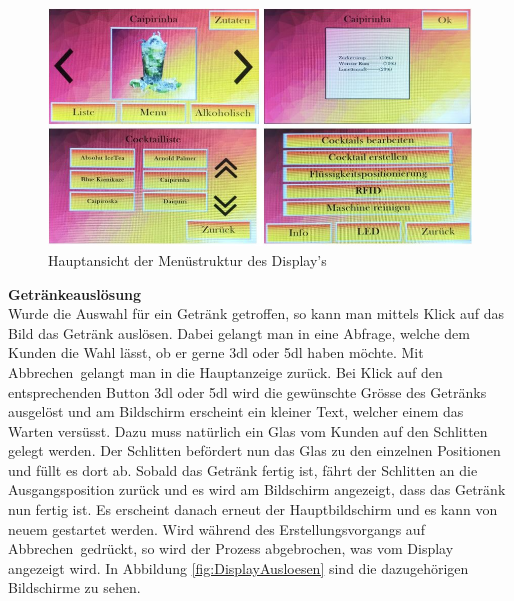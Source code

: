 \begin{figure}[H]
	\centering
	\includegraphics[width=\textwidth]{graphics/DisplayHauptmenu}
	\caption{Hauptansicht der Menüstruktur des Display's \cite{pngimgcom_cocktail_nodate-6}}
	\label{fig:DisplayHauptmenu}
\end{figure}

\textbf{Getränkeauslösung}\\
Wurde die Auswahl für ein Getränk getroffen, so kann man mittels Klick auf das Bild das Getränk auslösen. Dabei gelangt man in eine Abfrage, welche dem Kunden die Wahl lässt, ob er gerne 3dl oder 5dl haben möchte. Mit \flqq Abbrechen\frqq~gelangt man in die Hauptanzeige zurück. Bei Klick auf den entsprechenden Button 3dl oder 5dl wird die gewünschte Grösse des Getränks ausgelöst und am Bildschirm erscheint ein kleiner Text, welcher einem das Warten versüsst. Dazu muss natürlich ein Glas vom Kunden auf den Schlitten gelegt werden. Der Schlitten befördert nun das Glas zu den einzelnen Positionen und füllt es dort ab. Sobald das Getränk fertig ist, fährt der Schlitten an die Ausgangsposition zurück und es wird am Bildschirm angezeigt, dass das Getränk nun fertig ist. Es erscheint danach erneut der Hauptbildschirm und es kann von neuem gestartet werden. Wird während des Erstellungsvorgangs auf \flqq Abbrechen\frqq~gedrückt, so wird der Prozess abgebrochen, was vom Display angezeigt wird. In Abbildung \ref{fig:DisplayAusloesen} sind die dazugehörigen Bildschirme zu sehen.

